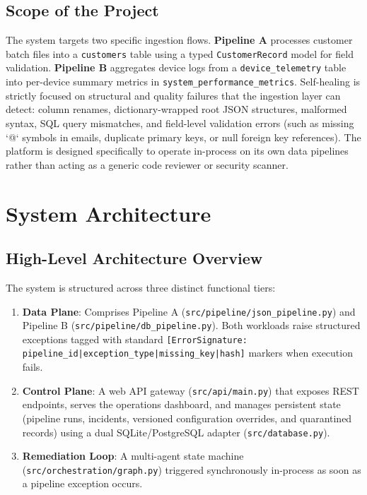 \documentclass[11pt]{article}
\newcommand{\code}[1]{\texttt{\small #1}}
\begin{document}
\subsection{Scope of the Project}
The system targets two specific ingestion flows. \textbf{Pipeline A} processes customer batch files into a \code{customers} table using a typed \code{CustomerRecord} model for field validation. \textbf{Pipeline B} aggregates device logs from a \code{device\_telemetry} table into per-device summary metrics in \code{system\_performance\_metrics}. Self-healing is strictly focused on structural and quality failures that the ingestion layer can detect: column renames, dictionary-wrapped root JSON structures, malformed syntax, SQL query mismatches, and field-level validation errors (such as missing `@` symbols in emails, duplicate primary keys, or null foreign key references). The platform is designed specifically to operate in-process on its own data pipelines rather than acting as a generic code reviewer or security scanner.

\section{System Architecture}

\subsection{High-Level Architecture Overview}
The system is structured across three distinct functional tiers:
\begin{enumerate}
  \item \textbf{Data Plane}: Comprises Pipeline A (\code{src/pipeline/json\_pipeline.py}) and Pipeline B (\code{src/pipeline/db\_pipeline.py}). Both workloads raise structured exceptions tagged with standard \code{[ErrorSignature: pipeline\_id|exception\_type|missing\_key|hash]} markers when execution fails.
  \item \textbf{Control Plane}: A web API gateway (\code{src/api/main.py}) that exposes REST endpoints, serves the operations dashboard, and manages persistent state (pipeline runs, incidents, versioned configuration overrides, and quarantined records) using a dual SQLite/PostgreSQL adapter (\code{src/database.py}).
  \item \textbf{Remediation Loop}: A multi-agent state machine (\code{src/orchestration/graph.py}) triggered synchronously in-process as soon as a pipeline exception occurs.
\end{enumerate}
\end{document}
